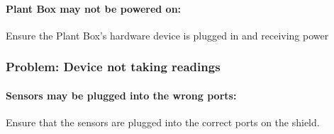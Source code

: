 \documentclass{article}
\begin{document}
			\paragraph{Plant Box may not be powered on:} Ensure the Plant Box's hardware device is plugged in and receiving power

	\subsubsection{Problem: Device not taking readings}
		\paragraph{Sensors may be plugged into the wrong ports:} Ensure that the sensors are plugged into the correct ports on the shield. 
\end{document}
